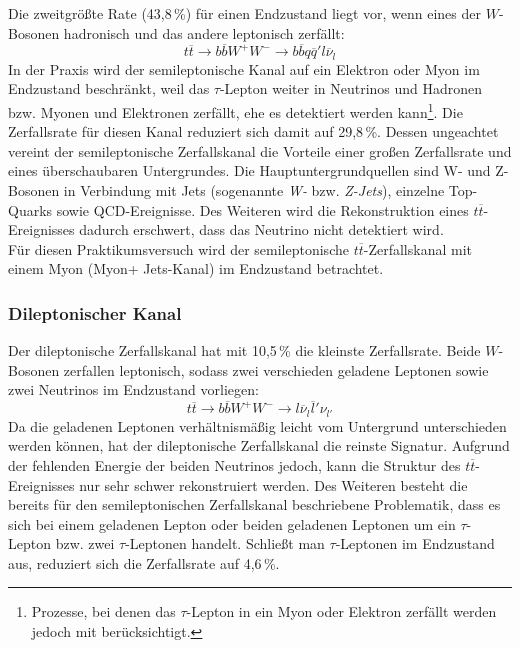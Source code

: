 Die zweitgr\"o\ss{}te Rate (43,8\,\%) f\"ur einen Endzustand liegt vor, wenn eines der $W$-Bosonen hadronisch und das andere leptonisch zerf\"allt:
\begin{equation*}
t\overline{t}\rightarrow b\overline{b}W^{+}W^{-}\rightarrow b\overline{b}q\overline{q}'l\overline{\nu}_{l}
\end{equation*}
In der Praxis wird der semileptonische Kanal auf ein Elektron oder Myon im Endzustand beschr\"ankt, weil das $\tau$-Lepton weiter in Neutrinos und Hadronen bzw. Myonen und Elektronen zerf\"allt, ehe es detektiert werden kann\footnote{Prozesse, bei denen das $\tau$-Lepton in ein Myon oder Elektron zerf\"allt werden jedoch mit ber\"ucksichtigt.}. Die Zerfallsrate f\"ur diesen Kanal reduziert sich damit auf 29,8\,\%. Dessen ungeachtet vereint der semileptonische Zerfalls\-kanal die Vorteile einer gro\ss{}en Zerfallsrate und eines \"uberschaubaren Untergrundes. Die Hauptuntergrundquellen sind W- und Z-Bosonen in Verbindung mit Jets (sogenannte \textit{W-} bzw. \textit{Z-Jets}), einzelne Top-Quarks sowie QCD-Ereignisse. Des Weiteren wird die Rekonstruktion eines $t\overline{t}$-Ereignisses dadurch erschwert, dass das Neutrino nicht detektiert wird. \\
F\"ur diesen Praktikumsversuch wird der semileptonische $t\overline{t}$-Zerfallskanal mit einem My\-on (Myon+ Jets-Kanal) im Endzustand betrachtet.

\subsubsection*{Dileptonischer Kanal}
Der dileptonische Zerfallskanal hat mit 10,5\,\% die kleinste Zerfallsrate. Beide $W$-Bosonen zerfallen leptonisch, sodass zwei verschieden geladene Leptonen sowie zwei Neutrinos im Endzustand vorliegen:
\begin{equation*}
t\overline{t}\rightarrow b\overline{b}W^{+}W^{-}\rightarrow l\overline{\nu}_{l}\overline{l}'\nu_{l'}
\end{equation*}
Da die geladenen Leptonen verh\"altnism\"a\ss{}ig leicht vom Untergrund unterschieden werden k\"onnen, hat der dileptonische Zerfallskanal die reinste Signatur. Aufgrund der fehlenden Energie der beiden Neutrinos jedoch, kann die Struktur des $t\overline{t}$-Ereignisses nur sehr schwer rekonstruiert werden. Des Weiteren besteht die bereits f\"ur den semileptonischen Zerfalls\-kanal beschriebene Problematik, dass es sich bei einem geladenen Lepton oder beiden geladenen Leptonen um ein $\tau$-Lepton bzw. zwei $\tau$-Leptonen handelt. Schlie\ss{}t man $\tau$-Leptonen im Endzustand aus, reduziert sich die Zerfallsrate auf 4,6\,\%.


